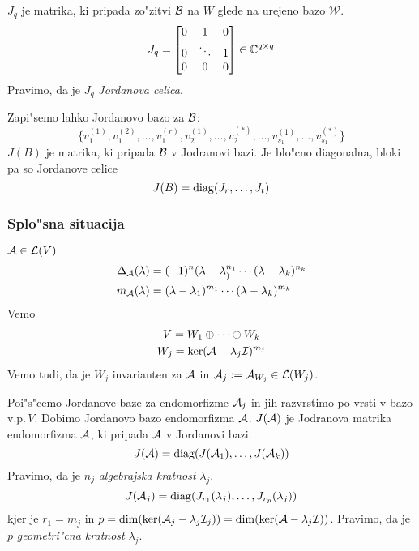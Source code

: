 $J_q$ je matrika, ki pripada zo"zitvi $\mathcal{B}$ na $W$ glede na urejeno bazo $\mathcal{W}$.
\begin{equation*}
J_q  = \begin{bmatrix}
0 & 1 & 0 \\
0 & \ddots & 1 \\
0 & 0 & 0
\end{bmatrix} \in \mathbb{C}^{q \times q}
\end{equation*}
Pravimo, da je $J_q$ \emph{Jordanova celica}. 

Zapi"semo lahko Jordanovo bazo za $\mathcal{B}$:
\begin{equation*}
\{v_1^{(1)}, v_1^{(2)}, \ldots, v_1^{(r)}, v_2^{(1)}, \ldots, v_2^{(*)}, \ldots, v_{s_1}^{(1)}, \ldots, v_{s_1}^{(*)}\}
\end{equation*}
$J(B)$ je matrika, ki pripada $\mathcal{B}$ v Jodranovi bazi. Je blo"cno diagonalna, bloki pa so Jordanove celice
\begin{equation*}
J(B) = \operatorname{diag} (J_r, \ldots, J_t)
\end{equation*}

\subsubsection*{Splo"sna situacija}
$\mathcal{A} \in \mathcal{L}(V)$
\begin{align*}
\Delta_{\mathcal{A}}(\lambda) &= (-1)^n (\lambda - \lambda_)^{n_1} \cdots (\lambda - \lambda_k)^{n_k} \\
m_{\mathcal{A}} (\lambda) &= (\lambda - \lambda_1)^{m_1} \cdots (\lambda - \lambda_k)^{m_k}
\end{align*}
Vemo
\begin{gather}
V = W_1 \oplus \cdots \oplus W_k \\
W_j = \ker (\mathcal{A} - \lambda_j \mathcal{I})^{m_j} \\
\end{gather}
Vemo tudi, da je $W_j$ invarianten za $\mathcal{A}$ in $\mathcal{A}_j := \mathcal{A}_{W_j} \in \mathcal{L}(W_j)$.

Poi"s"cemo Jordanove baze za endomorfizme $\mathcal{A}_j$ in jih razvrstimo po vrsti v bazo v.p.\,$V$. Dobimo Jordanovo bazo endomorfizma $\mathcal{A}$. $J(\mathcal{A})$ je Jodranova matrika endomorfizma $\mathcal{A}$, ki pripada $\mathcal{A}$ v Jordanovi bazi.
\begin{equation*}
J(\mathcal{A}) = \operatorname{diag}( J(\mathcal{A}_1), \ldots, J(\mathcal{A}_k))
\end{equation*}
Pravimo, da je $n_j$ \emph{algebrajska kratnost} $\lambda_j$.
\begin{equation*}
J(\mathcal{A}_j) = \operatorname{diag} (J_{r_1}(\lambda_j), \ldots, J_{r_p}(\lambda_j))
\end{equation*}
kjer je $r_1 = m_j$ in $p = \dim (\ker (\mathcal{A}_j - \lambda_j \mathcal{I}_j)) = \dim(\ker(\mathcal{A} - \lambda_j \mathcal{I}))$. Pravimo, da je $p$ \emph{geometri"cna kratnost} $\lambda_j$.

